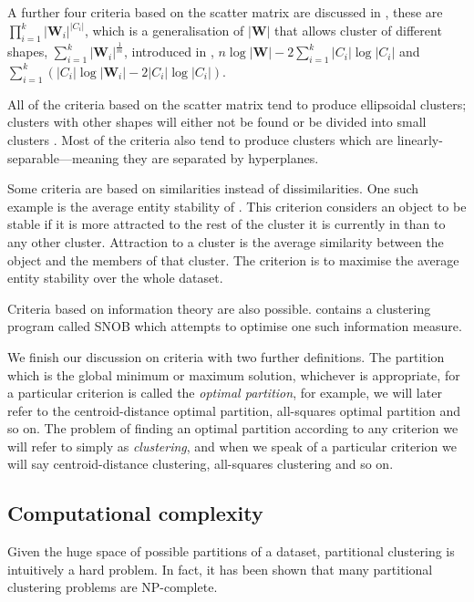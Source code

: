 \documentclass[a4paper]{report}
\begin{document}
A further four criteria based on the scatter matrix are discussed in
\citep{marriott1982optimization}, these are
$\prod_{i=1}^{k}|\mathbf{W}_i|^{|C_i|}$, which is a generalisation of
$|\mathbf{W}|$ that allows cluster of different shapes,
$\sum_{i=1}^{k}|\mathbf{W}_i|^{\frac{1}{m}}$, introduced in
\citep{maronna1974}, $n \log{|\mathbf{W}|} - 2\sum_{i=1}^{k} |C_i|
\log{|C_i|}$ and $\sum_{i=1}^{k} (|C_i| \log{|\mathbf{W}_i|} -
2|C_i|\log{|C_i|})$.

All of the criteria based on the scatter matrix tend to produce ellipsoidal
clusters; clusters with other shapes will either not be found or be divided
into small clusters \citep{marriott1982optimization}.  Most of the criteria
also tend to produce clusters which are linearly-separable---meaning they are
separated by hyperplanes.

Some criteria are based on similarities instead of dissimilarities.  One such
example is the average entity stability of \citep{Rubin67optimal}.  This
criterion considers an object to be stable if it is more attracted to the rest
of the cluster it is currently in than to any other cluster.  Attraction to a
cluster is the average similarity between the object and the members of that
cluster.  The criterion is to maximise the average entity stability over the
whole dataset.

Criteria based on information theory are also possible.
\citet{wallace1968information} contains a clustering program called SNOB which
attempts to optimise one such information measure.

We finish our discussion on criteria with two further definitions.  The
partition which is the global minimum or maximum solution, whichever is
appropriate, for a particular criterion is called the \textit{optimal
  partition}, for example, we will later refer to the centroid-distance
optimal partition, all-squares optimal partition and so on.  The problem of
finding an optimal partition according to any criterion we will refer to
simply as \textit{clustering}, and when we speak of a particular criterion we
will say centroid-distance clustering, all-squares clustering and so on.

\subsection{Computational complexity}
\label{sec:complexity-issues}

Given the huge space of possible partitions of a dataset, partitional
clustering is intuitively a hard problem.  In fact, it has been shown that
many partitional clustering problems are NP-complete.
\end{document}
